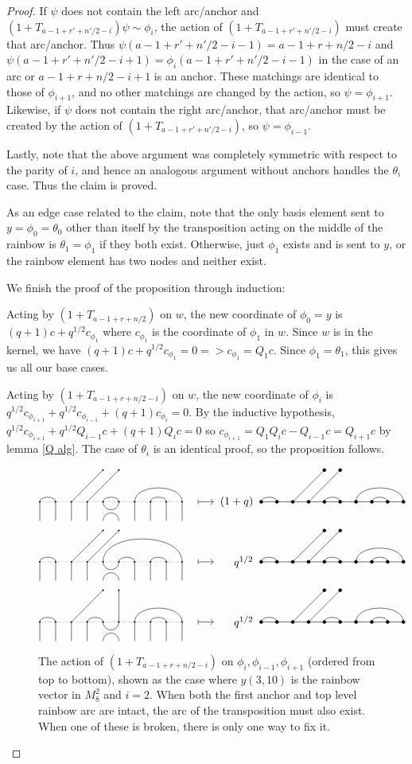 \documentclass{amsart}
\begin{document}
\begin{proof}
	If $\psi$ does not contain the left arc/anchor and $(1+T_{a-1+r'+n'/2-i})\psi\sim \phi_i$, the action of $(1+T_{a-1+r'+n'/2-i})$ must create that arc/anchor. Thus $\psi(a-1+r'+n'/2-i-1)=a-1+r+n/2-i$ and $\psi(a-1+r'+n'/2-i+1)=\phi_i(a-1+r'+n'/2-i-1)$ in the case of an arc or $a-1+r+n/2-i+1$ is an anchor. These matchings are identical to those of $\phi_{i+1}$, and no other matchings are changed by the action, so $\psi=\phi_{i+1}$. Likewise, if $\psi$ does not contain the right arc/anchor, that arc/anchor must be created by the action of $(1+T_{a-1+r'+n'/2-i})$, so $\psi=\phi_{i-1}$.
	
	Lastly, note that the above argument was completely symmetric with respect to the parity of $i$, and hence an analogous argument without anchors handles the $\theta_i$ case. Thus the claim is proved.
	
	\vspace{2mm}
	As an edge case related to the claim, note that the only basis element sent to $y=\phi_0=\theta_0$ other than itself by the transposition acting on the middle of the rainbow is $\theta_1=\phi_1$ if they both exist. Otherwise, just $\phi_1$ exists and is sent to $y$, or the rainbow element has two nodes and neither exist.
	
	We finish the proof of the proposition through induction:
	
	Acting by $(1+T_{a-1+r+n/2})$ on $w$, the new coordinate of $\phi_0=y$ is $(q+1)c+q^{1/2}c_{\phi_1}$ where $c_{\phi_1}$ is the coordinate of $\phi_1$ in $w$. Since $w$ is in the kernel, we have $(q+1)c+q^{1/2}c_{\phi_1}=0=>c_{\phi_1}=Q_1c$. Since $\phi_1=\theta_1$, this gives us all our base cases.
	
	Acting by $(1+T_{a-1+r+n/2-i})$ on $w$, the new coordinate of $\phi_i$ is $q^{1/2}c_{\phi_{i+1}}+q^{1/2}c_{\phi_{i-1}}+(q+1)c_{\phi_{i}}=0$. By the inductive hypothesis, $q^{1/2}c_{\phi_{i+1}}+q^{1/2}Q_{i-1}c+(q+1)Q_ic=0$ so $c_{\phi_{i+1}}=Q_1Q_ic-Q_{i-1}c=Q_{i+1}c$ by lemma \ref{Q alg}. The case of $\theta_i$ is an identical proof, so the proposition follows. 
	
	
	\begin{figure}
		\[
		\GeneralizedAction{10}{1/2,5/6,7/10,8/9}{2}{3/1,4/2}{1}{5}{1/2,5/6,7/10,8/9}{3/1,4/2}{(1+q)}
		\]
		\[
		\GeneralizedAction{10}{1/2,5/10,6/7,8/9}{2}{3/1,4/2}{1}{5}{1/2,5/6,7/10,8/9}{3/1,4/2}{q^{1/2}}
		\]
		\[
		\GeneralizedAction{10}{1/2,4/5,7/10,8/9}{2}{3/1,6/2}{1}{5}{1/2,5/6,7/10,8/9}{3/1,4/2}{q^{1/2}}
		\]
		\caption{The action of $(1+T_{a-1+r+n/2-i})$ on $\phi_i,\phi_{i-1},\phi_{i+1}$ (ordered from top to bottom), shown as the case where $y(3,10)$ is the rainbow vector in $M_{8}^2$ and $i=2$. When both the first anchor and top level rainbow arc are intact, the arc of the transposition must also exist. When one of these is broken, there is only one way to fix it.}
		\label{shifted relations}
	\end{figure}
\end{proof}	
\end{document}
